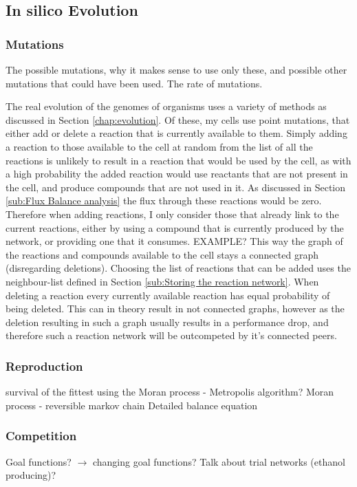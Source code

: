 \documentclass[10pt,a4paper]{article}
\begin{document}
\subsection{In silico Evolution}
\label{sub:Implementing evolution}
\subsubsection{Mutations}
\label{ssub:Mutations}
The possible mutations, why it makes sense to use only these, and possible other mutations that could have been used. The rate of mutations. 



	The real evolution of the genomes of organisms uses a variety of methods as discussed in Section \ref{chap:evolution}. Of these, my cells use point mutations, that either add or delete a reaction that is currently available to them. Simply adding a reaction to those available to the cell at random from the list of all the reactions is unlikely to result in a reaction that would be used by the cell, as with a high probability the added reaction would use reactants that are not present in the cell, and produce compounds that are not used in it. As discussed in Section \ref{sub:Flux Balance analysis} the flux through these reactions would be zero. Therefore when adding reactions, I only consider those that already link to the current reactions, either by using a compound that is currently produced by the network, or providing one that it consumes. EXAMPLE? This way the graph of the reactions and compounds available to the cell stays a connected graph (disregarding deletions). Choosing the list of reactions that can be added uses the neighbour-list defined in Section \ref{sub:Storing the reaction network}. When deleting a reaction every currently available reaction has equal probability of being deleted. This can in theory result in not connected graphs, however as the deletion resulting in such a graph usually results in a performance drop, and therefore such a reaction network will be outcompeted by it's connected peers. 
\subsubsection{Reproduction}
\label{ssub:Reproduction}
survival of the fittest using the Moran process - Metropolis algorithm?
Moran process - reversible markov chain
Detailed balance equation

\subsubsection{Competition}
\label{ssub:Competition}
Goal functions? $\rightarrow$ changing goal functions? Talk about trial networks (ethanol producing)?
\end{document}
